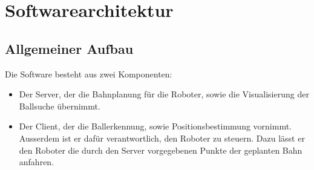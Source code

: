 
\chapter{Softwarearchitektur}
\label{cha:softwarearchitektur}

\section{Allgemeiner Aufbau}
\label{sec:allgemeiner-aufbau}

Die Software besteht aus zwei Komponenten:
\begin{itemize}
\item Der Server, der die Bahnplanung für die Roboter, sowie die
  Visualisierung der Ballsuche übernimmt.
\item Der Client, der die Ballerkennung, sowie Positionsbestimmung
  vornimmt. Ausserdem ist er dafür verantwortlich, den Roboter zu
  steuern. Dazu lässt er den Roboter die durch den Server vorgegebenen
  Punkte der geplanten Bahn anfahren. 
\end{itemize}


